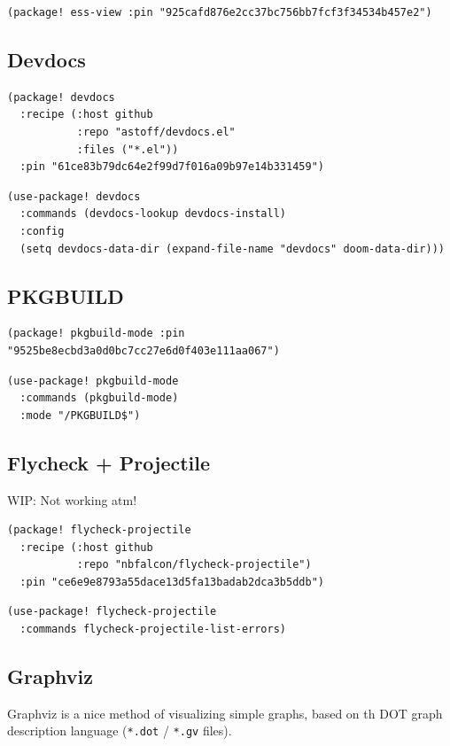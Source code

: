 \documentclass[11pt]{article}
\begin{document}
\begin{verbatim}
(package! ess-view :pin "925cafd876e2cc37bc756bb7fcf3f34534b457e2")
\end{verbatim}

\subsection{Devdocs}
\label{sec:org4928378}
\begin{verbatim}
(package! devdocs
  :recipe (:host github
           :repo "astoff/devdocs.el"
           :files ("*.el"))
  :pin "61ce83b79dc64e2f99d7f016a09b97e14b331459")
\end{verbatim}

\begin{verbatim}
(use-package! devdocs
  :commands (devdocs-lookup devdocs-install)
  :config
  (setq devdocs-data-dir (expand-file-name "devdocs" doom-data-dir)))
\end{verbatim}

\subsection{PKGBUILD}
\label{sec:orgfb1f326}

\begin{verbatim}
(package! pkgbuild-mode :pin "9525be8ecbd3a0d0bc7cc27e6d0f403e111aa067")
\end{verbatim}

\begin{verbatim}
(use-package! pkgbuild-mode
  :commands (pkgbuild-mode)
  :mode "/PKGBUILD$")
\end{verbatim}

\subsection{Flycheck + Projectile}
\label{sec:org71d05bb}
WIP: Not working atm!

\begin{verbatim}
(package! flycheck-projectile
  :recipe (:host github
           :repo "nbfalcon/flycheck-projectile")
  :pin "ce6e9e8793a55dace13d5fa13badab2dca3b5ddb")
\end{verbatim}

\begin{verbatim}
(use-package! flycheck-projectile
  :commands flycheck-projectile-list-errors)
\end{verbatim}

\subsection{Graphviz}
\label{sec:org410d988}
Graphviz is a nice method of visualizing simple graphs, based on th DOT graph
description language (\texttt{*.dot} / \texttt{*.gv} files).
\end{document}
